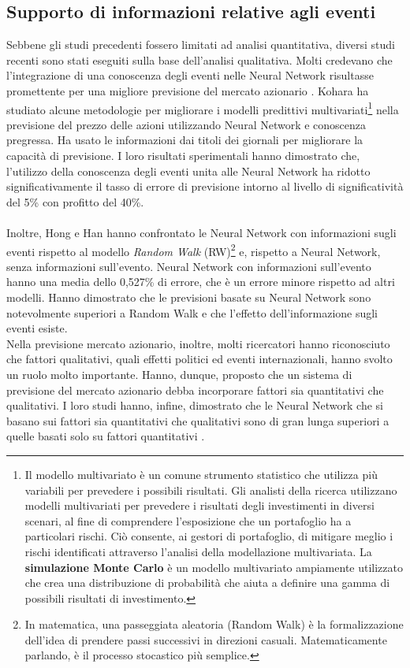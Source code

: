\documentclass[a4paper,12pt]{report}
\begin{document}
\subsection{Supporto di informazioni relative agli eventi}
Sebbene gli studi precedenti fossero limitati ad analisi quantitativa, diversi studi recenti sono stati eseguiti sulla base dell'analisi qualitativa. Molti credevano che l'integrazione di una conoscenza degli eventi nelle Neural Network risultasse promettente per una migliore previsione del mercato azionario \cite{know-nn}\cite{news-nn}\cite{know-nn2}\cite{news-nn2}. Kohara \cite{know-nn2} ha studiato alcune metodologie per migliorare i modelli predittivi multivariati\footnote{Il modello multivariato è un comune strumento statistico che utilizza più variabili per prevedere i possibili risultati. Gli analisti della ricerca utilizzano modelli multivariati per prevedere i risultati degli investimenti in diversi scenari, al fine di comprendere l'esposizione che un portafoglio ha a particolari rischi. Ciò consente, ai gestori di portafoglio, di mitigare meglio i rischi identificati attraverso l'analisi della modellazione multivariata. La \textbf{simulazione Monte Carlo} è un modello multivariato ampiamente utilizzato che crea una distribuzione di probabilità che aiuta a definire una gamma di possibili risultati di investimento.} nella previsione del prezzo delle azioni utilizzando Neural Network e conoscenza pregressa. Ha usato le informazioni dai titoli dei giornali per migliorare la capacità di previsione. I loro risultati sperimentali hanno dimostrato che, l'utilizzo della conoscenza degli eventi unita alle Neural Network ha ridotto significativamente il tasso di errore di previsione intorno al livello di significatività del 5\% con profitto del 40\%.\\~\\
Inoltre, Hong e Han \cite{know-nn} hanno confrontato le Neural Network con informazioni sugli eventi rispetto al modello \textit{Random Walk} (RW)\footnote{In matematica, una passeggiata aleatoria (Random Walk) è la formalizzazione dell'idea di prendere passi successivi in direzioni casuali. Matematicamente parlando, è il processo stocastico più semplice.} e, rispetto a Neural Network, senza informazioni sull'evento. Neural Network con informazioni sull'evento hanno una media dello 0,527\% di errore, che è un errore minore rispetto ad altri modelli. Hanno dimostrato che le previsioni basate su Neural Network sono notevolmente superiori a Random Walk e che l'effetto dell'informazione sugli eventi esiste.\\
Nella previsione mercato azionario, inoltre, molti ricercatori hanno riconosciuto che fattori qualitativi, quali effetti politici ed eventi internazionali, hanno svolto un ruolo molto importante. Hanno, dunque, proposto che un sistema di previsione del mercato azionario debba incorporare fattori sia quantitativi che qualitativi. I loro studi hanno, infine, dimostrato che le Neural Network che si basano sui fattori sia quantitativi che qualitativi sono di gran lunga superiori a quelle basati solo su fattori quantitativi \cite{fuzzy-nn1}\cite{fuzzy-nn2}.
\end{document}
